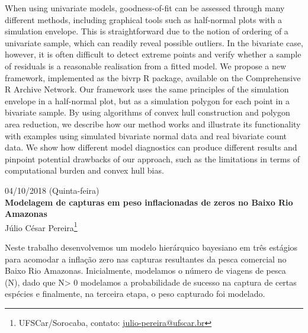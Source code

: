 \documentclass[9pt, a5paper]{article}
\begin{document}
When using univariate models, goodness-of-fit can be assessed through
many different methods, including graphical tools such as half-normal
plots with a simulation envelope. This is straightforward due to the
notion of ordering of a univariate sample, which can readily reveal
possible outliers. In the bivariate case, however, it is often difficult
to detect extreme points and verify whether a sample of residuals is a
reasonable realisation from a fitted model. We propose a new framework,
implemented as the bivrp R package, available on the Comprehensive R
Archive Network. Our framework uses the same principles of the
simulation envelope in a half-normal plot, but as a simulation polygon
for each point in a bivariate sample. By using algorithms of convex hull
construction and polygon area reduction, we describe how our method
works and illustrate its functionality with examples using simulated
bivariate normal data and real bivariate count data. We show how
different model diagnostics can produce different results and pinpoint
potential drawbacks of our approach, such as the limitations in terms of
computational burden and convex hull bias.

\clearpage


\begin{center}
  {\footnotesize 04/10/2018 (Quinta-feira)}\\
  \textbf{\large
    Modelagem de capturas em peso inflacionadas de zeros no Baixo Rio
    Amazonas}\\
  Júlio César Pereira\footnote{UFSCar/Sorocaba, contato:
    \url{julio-pereira@ufscar.br}}
\end{center}

Neste trabalho desenvolvemos um modelo hierárquico bayesiano em três
estágios para acomodar a inflação zero nas capturas resultantes da pesca
comercial no Baixo Rio Amazonas. Inicialmente, modelamos o número de
viagens de pesca (N), dado que N> 0 modelamos a probabilidade de sucesso
na captura de certas espécies e finalmente, na terceira etapa, o peso
capturado foi modelado.

\clearpage

\end{document}
